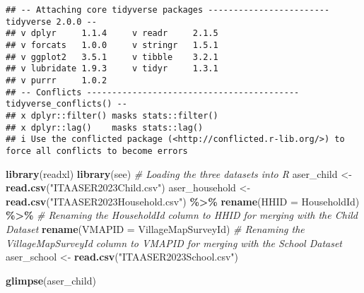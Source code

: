 \documentclass[
]{article}
\newenvironment{Shaded}{\begin{snugshade}}{\end{snugshade}}
\newcommand{\AttributeTok}[1]{\textcolor[rgb]{0.13,0.29,0.53}{#1}}
\newcommand{\CommentTok}[1]{\textcolor[rgb]{0.56,0.35,0.01}{\textit{#1}}}
\newcommand{\FunctionTok}[1]{\textcolor[rgb]{0.13,0.29,0.53}{\textbf{#1}}}
\newcommand{\NormalTok}[1]{#1}
\newcommand{\OtherTok}[1]{\textcolor[rgb]{0.56,0.35,0.01}{#1}}
\newcommand{\SpecialCharTok}[1]{\textcolor[rgb]{0.81,0.36,0.00}{\textbf{#1}}}
\newcommand{\StringTok}[1]{\textcolor[rgb]{0.31,0.60,0.02}{#1}}
\begin{document}
\begin{verbatim}
## -- Attaching core tidyverse packages ------------------------ tidyverse 2.0.0 --
## v dplyr     1.1.4     v readr     2.1.5
## v forcats   1.0.0     v stringr   1.5.1
## v ggplot2   3.5.1     v tibble    3.2.1
## v lubridate 1.9.3     v tidyr     1.3.1
## v purrr     1.0.2     
## -- Conflicts ------------------------------------------ tidyverse_conflicts() --
## x dplyr::filter() masks stats::filter()
## x dplyr::lag()    masks stats::lag()
## i Use the conflicted package (<http://conflicted.r-lib.org/>) to force all conflicts to become errors
\end{verbatim}

\begin{Shaded}
\begin{Highlighting}[]
\FunctionTok{library}\NormalTok{(readxl)}
\FunctionTok{library}\NormalTok{(see)}
\CommentTok{\# Loading the three datasets into R}
\NormalTok{aser\_child }\OtherTok{\textless{}{-}} \FunctionTok{read.csv}\NormalTok{(}\StringTok{"ITAASER2023Child.csv"}\NormalTok{)}
\NormalTok{aser\_household }\OtherTok{\textless{}{-}} \FunctionTok{read.csv}\NormalTok{(}\StringTok{"ITAASER2023Household.csv"}\NormalTok{) }\SpecialCharTok{\%\textgreater{}\%} 
  \FunctionTok{rename}\NormalTok{(}\AttributeTok{HHID =}\NormalTok{ HouseholdId) }\SpecialCharTok{\%\textgreater{}\%} \CommentTok{\# Renaming the HouseholdId column to HHID for merging with the Child Dataset}
  \FunctionTok{rename}\NormalTok{(}\AttributeTok{VMAPID =}\NormalTok{ VillageMapSurveyId) }\CommentTok{\# Renaming the VillageMapSurveyId column to VMAPID for merging with the School Dataset}
\NormalTok{aser\_school }\OtherTok{\textless{}{-}} \FunctionTok{read.csv}\NormalTok{(}\StringTok{"ITAASER2023School.csv"}\NormalTok{)}

\FunctionTok{glimpse}\NormalTok{(aser\_child)}
\end{Highlighting}
\end{Shaded}
\end{document}
